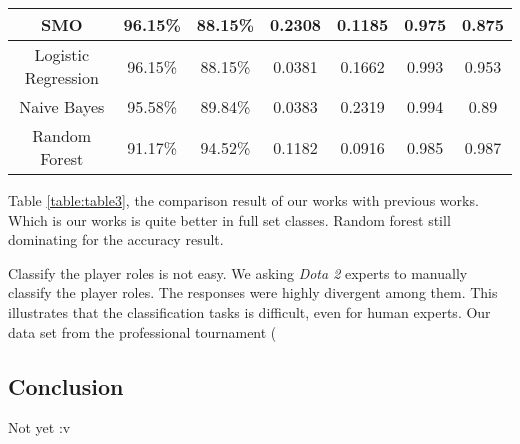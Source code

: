 \begin{table}[]
{\begin{tabular}{|c|c|c|c|c|c|c|}
SMO                             & 96.15\%            & 88.15\%           & 0.2308                  & 0.1185                  & 0.975                & 0.875                \\ \hline
Logistic Regression             & 96.15\%            & 88.15\%           & 0.0381                  & 0.1662                  & 0.993                & 0.953                \\ \hline
Naive Bayes                     & 95.58\%            & 89.84\%           & 0.0383                  & 0.2319                  & 0.994                & 0.89                 \\ \hline
Random Forest                   & 91.17\%            & 94.52\%           & 0.1182                  & 0.0916                  & 0.985                & 0.987                \\ \hline
\end{tabular}%
}
\end{table}

Table \ref{table:table3}, the comparison result of our works with previous works. Which is our works is quite better in full set classes. Random forest still dominating for the accuracy result.

Classify the player roles is not easy. We asking \textit{Dota 2} experts to manually classify the player roles. The responses were highly divergent among them. This illustrates that the classification tasks is difficult, even for human experts. Our data set from the professional tournament (

\subsection{Conclusion}
\label{sec:conclusion}

Not yet :v

